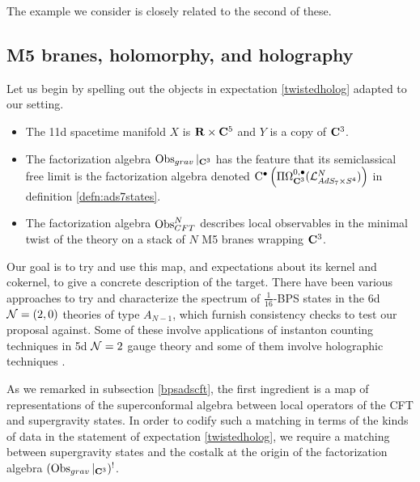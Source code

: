 The example we consider is closely related to the second of these. 
\iffalse
Indeed, there is an odd nilpotent element in $\mf{osp}(6|2)$, which we refer to as $S$ in the sequel. Using the inner action of $\mf{osp}(6|2)$ on our eleven-dimensional model on twisted $AdS_7\times S^4$ as identified in proposition \ref{prop:brads7}, $S$ affords a deformation of our model. This is the deformation considered in \cite{BeemEtAl}, and it induces a specialization of characters called the Schur limit.
\fi

\subsection{M5 branes, holomorphy, and holography}
Let us begin by spelling out the objects in expectation \ref{twistedholog} adapted to our setting. 

\begin{itemize}
\item The 11d spacetime manifold $X$ is $\mathbf{R}\times \mathbf{C}^5$ and $Y$ is a copy of $\mathbf{C}^3$. 
\item The factorization algebra $\operatorname{Obs}_{grav}|_{\mathbf{C}^3}$ has the feature that its semiclassical free limit is the factorization algebra denoted ${\rm C} ^\bullet \left ( \Pi \Omega^{0,\bullet}_{\mathbf{C}^3} (\mathcal{L}^N_{AdS_7\times S^4})\right )$ in definition \ref{defn:ads7states}.
\item The factorization algebra $\operatorname{Obs}^N_{CFT}$ describes local observables in the minimal twist of the theory on a stack of $N$ M5 branes wrapping $\mathbf{C}^3$. 
\end{itemize}

Our goal is to try and use this map, and expectations about its kernel and cokernel, to give a concrete description of the target. There have been various approaches to try and characterize the spectrum of $\frac{1}{16}$-BPS states in the 6d $\mathcal{N}=(2,0)$ theories of type $A_{N-1}$, which furnish consistency checks to test our proposal against. Some of these involve applications of instanton counting techniques in 5d $\mathcal{N}=2$ gauge theory \cite{Kim:2013nva} and some of them involve holographic techniques \cite{Imamura}.

As we remarked in subsection \ref{bpsadscft}, the first ingredient is a map of representations of the superconformal algebra between local operators of the CFT and supergravity states. In order to codify such a matching in terms of the kinds of data in the statement of expectation \ref{twistedholog}, we require a matching between supergravity states and the costalk at the origin of the factorization algebra $(\operatorname{Obs}_{grav}|_{\mathbf{C}^3})^!$. 

